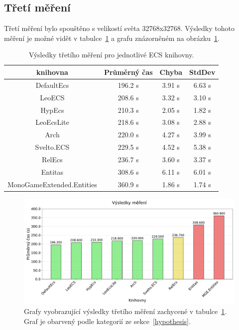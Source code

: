 \subsection{Třetí měření}
Třetí měření bylo spouštěno s velikostí světa 32768x32768. Výsledky tohoto měření je možné vidět v tabulce~\ref{tab:third-benchmark-results} a grafu znázorněném na obrázku~\ref{fig:third-benchmark-results}.

\begin{table}[!htb]
    \centering\footnotesize\sf
    \begin{tabular}{c c c c}
        \toprule
        knihovna & Průměrný čas & Chyba & StdDev \\
        \midrule
        DefaultEcs & 196.2 s & 3.91 s & 6.63 s \\
        LeoECS & 208.6 s & 3.32 s & 3.10 s \\
        HypEcs & 210.3 s & 2.05 s & 1.82 s \\
        LeoEcsLite & 218.6 s & 3.08 s & 2.88 s \\
        Arch & 220.0 s & 4.27 s & 3.99 s \\
        Svelto.ECS & 229.5 s & 4.52 s & 5.38 s \\
        RelEcs & 236.7 s & 3.60  s & 3.37 s \\
        Entitas & 308.6 s &6.11 s & 6.01 s \\
        MonoGameExtended.Entities & 360.9 s & 1.86 s & 1.74 s \\
        \bottomrule
    \end{tabular}
    \caption{Výsledky třetího měření pro jednotlivé ECS knihovny.}
    \label{tab:third-benchmark-results}
\end{table}

\begin{figure}[!htb]
    \centering
    \includegraphics[width=1.0\linewidth]{plots/third_benchmark_results.pdf}
    \caption{Grafy vyobrazující výsledky třetího měření zachycené v tabulce~\ref{tab:third-benchmark-results}. Graf je obarvený podle kategorií ze sekce~\ref{hypothesis}.}
    \label{fig:third-benchmark-results}
\end{figure}

